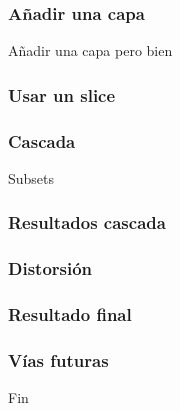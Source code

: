 \documentclass{beamer}
\begin{document}
\begin{frame}
\frametitle{Añadir una capa}
Añadir una capa pero bien

\end{frame}



\begin{frame}
\frametitle{Usar un slice}

\end{frame}



\begin{frame}
\frametitle{Cascada}
Subsets

\end{frame}



\begin{frame}
\frametitle{Resultados cascada}

\end{frame}



\begin{frame}
\frametitle{Distorsión}

\end{frame}



\begin{frame}
\frametitle{Resultado final}

\end{frame}



\begin{frame}
\frametitle{Vías futuras}

\end{frame}



\begin{frame}
\Huge{\centerline{Fin}}
\end{frame}
\end{document}
